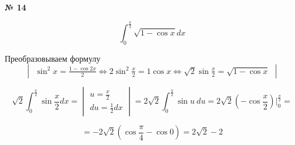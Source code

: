\documentclass{article}
\begin{document}
\textbf{№ 14} 

\begingroup

\Large

$$ \int_{0}^{\frac{\pi}{2}} \sqrt{1 - \cos{x}} dx $$

Преобразовываем формулу
$$ \begin{vmatrix} \sin^2{x} = \frac{1-\cos{2x}}{2} 
\Leftrightarrow 2\sin^2{\frac{x}{2}} = 1 \cos{x} 
\Leftrightarrow \sqrt{2}\sin{\frac{x}{2}} = \sqrt{1-\cos{x}} \end{vmatrix} $$

$$ \sqrt{2} \int_{0}^{\frac{\pi}{2}} \sin{\frac{x}{2}}dx
= \begin{vmatrix} u = \frac{x}{2} \\ 
                 du = \frac{1}{2}dx \end{vmatrix} 
= 2\sqrt{2} \int_{0}^{\frac{\pi}{2}} \sin{u} \ du
= 2\sqrt{2} \left(-\cos{\frac{x}{2}} \right) \bigg\vert_{0}^{\frac{\pi}{2}}
= $$

$$ = -2\sqrt{2} \left( \cos{\frac{\pi}{4}} - \cos{0} \right)
= 2\sqrt{2} - 2 $$

\endgroup
\end{document}
